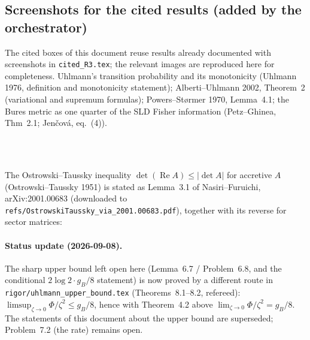 \documentclass[11pt]{article}
\theoremstyle{definition}\newtheorem{problem}[theorem]{Problem}
\begin{document}
\subsection*{Screenshots for the cited results (added by the orchestrator)}
The cited boxes of this document reuse results already documented with screenshots in \texttt{cited\_R3.tex}; the relevant images are reproduced here for completeness.  Uhlmann's transition probability and its monotonicity (Uhlmann 1976, definition and monotonicity statement); Alberti--Uhlmann 2002, Theorem~2 (variational and supremum formulas); Powers--St\o rmer 1970, Lemma~4.1; the Bures metric as one quarter of the SLD Fisher information (Petz--Ghinea, Thm~2.1; Jen\v cov\'a, eq.~(4)).
\begin{center}
\hfill
{}\\[4pt]
\hfill
{}\\[4pt]
\hfill
{}
\end{center}
The Ostrowski--Taussky inequality \(\det(\operatorname{Re}A)\le|\det A|\) for accretive \(A\) (Ostrowski--Taussky 1951) is stated as Lemma~3.1 of Nasiri--Furuichi, arXiv:2001.00683 (downloaded to \texttt{refs/OstrowskiTaussky\_via\_2001.00683.pdf}), together with its reverse for sector matrices:
\begin{center}\end{center}


\paragraph{Status update (2026-09-08).} The sharp upper bound left open here (Lemma~6.7 / Problem~6.8, and the conditional \(2\log2\cdot g_B/8\) statement) is now proved by a different route in \texttt{rigor/uhlmann\_upper\_bound.tex} (Theorems~8.1--8.2, refereed): \(\limsup_{\zeta\to0}\Phi/\zeta^2\le g_B/8\), hence with Theorem~4.2 above \(\lim_{\zeta\to0}\Phi/\zeta^2=g_B/8\).  The statements of this document about the upper bound are superseded; Problem~7.2 (the rate) remains open.
\end{document}
